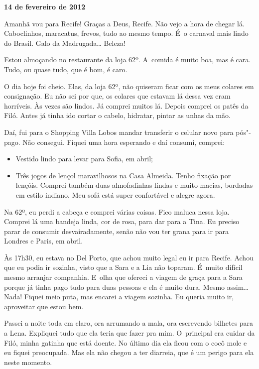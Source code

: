 \begin{flushright}\textbf{}\end{flushright}

\begin{flushright}\textbf{14 de fevereiro de 2012}\end{flushright}


Amanhã vou para Recife! Graças a Deus, Recife. Não vejo a hora de chegar
lá. Caboclinhos, maracatus, frevos, tudo ao mesmo tempo. É~o carnaval
mais lindo do Brasil. Galo da Madrugada… Beleza!

Estou almoçando no restaurante da loja 62º. A~comida é muito boa, mas é
cara. Tudo, ou quase tudo, que é bom, é caro.

O dia hoje foi cheio. Elas, da loja 62º, não quiseram ficar com os meus
colares em consignação. Eu não sei por que, os colares que estavam lá
dessa vez eram horríveis. Às vezes são lindos. Já comprei muitos lá.
Depois comprei os patês da Filó. Antes já tinha ido cortar o cabelo,
hidratar, pintar as unhas da mão.

Daí, fui para o Shopping Villa Lobos mandar transferir o celular novo
para pós"-pago. Não consegui. Fiquei uma hora esperando e daí consumi,
comprei:

\begin{itemize}
\item
  Vestido lindo para levar para Sofia, em abril;
\item
  Três jogos de lençol maravilhosos na Casa Almeida. Tenho fixação por
  lençóis. Comprei também duas almofadinhas lindas e muito macias,
  bordadas em estilo indiano. Meu sofá está super confortável e alegre
  agora.
\end{itemize}
Na 62º, eu perdi a cabeça e comprei várias coisas. Fico maluca nessa
loja. Comprei lá uma bandeja linda, cor de rosa, para dar para a Tina.
Eu preciso parar de consumir desvairadamente, senão não vou ter grana
para ir para Londres e Paris, em abril.

Às 17h30, eu estava no Del Porto, que achou muito legal eu ir para
Recife. Achou que eu podia ir sozinha, visto que a Sara e a Lia não
toparam. É~muito difícil mesmo arranjar companhia. E~olha que ofereci a
viagem de graça para a Sara porque já tinha pago tudo para duas pessoas
e ela é muito dura. Mesmo assim… Nada! Fiquei meio puta, mas
encarei a viagem sozinha. Eu queria muito ir, aproveitar que estou bem.

Passei a noite toda em claro, ora arrumando a mala, ora escrevendo
bilhetes para a Lena. Expliquei tudo que ela teria que fazer pra mim. O~principal era cuidar da Filó, minha gatinha que está doente. No último
dia ela ficou com o cocô mole e eu fiquei preocupada. Mas ela não
chegou a ter diarreia, que é um perigo para ela neste momento.

